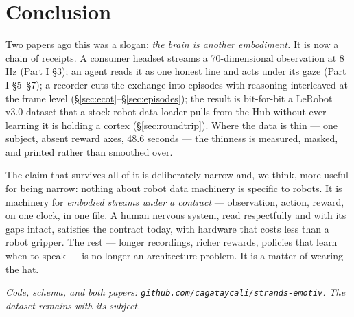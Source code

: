 \documentclass{article}
\begin{document}
\section{Conclusion}
\label{sec:conclusion}

Two papers ago this was a slogan: \emph{the brain is another embodiment.} It is now a chain of receipts. A consumer headset streams a 70-dimensional observation at 8\,Hz (Part I \S3); an agent reads it as one honest line and acts under its gaze (Part I \S5--\S7); a recorder cuts the exchange into episodes with reasoning interleaved at the frame level (\S\ref{sec:ecot}--\S\ref{sec:episodes}); the result is bit-for-bit a LeRobot v3.0 dataset that a stock robot data loader pulls from the Hub without ever learning it is holding a cortex (\S\ref{sec:roundtrip}). Where the data is thin --- one subject, absent reward axes, 48.6 seconds --- the thinness is measured, masked, and printed rather than smoothed over.

The claim that survives all of it is deliberately narrow and, we think, more useful for being narrow: nothing about robot data machinery is specific to robots. It is machinery for \emph{embodied streams under a contract} --- observation, action, reward, on one clock, in one file. A human nervous system, read respectfully and with its gaps intact, satisfies the contract today, with hardware that costs less than a robot gripper. The rest --- longer recordings, richer rewards, policies that learn when to speak --- is no longer an architecture problem. It is a matter of wearing the hat.

\vspace{2mm}
\noindent\emph{Code, schema, and both papers: \texttt{github.com/cagataycali/strands-emotiv}. The dataset remains with its subject.}



\end{document}
